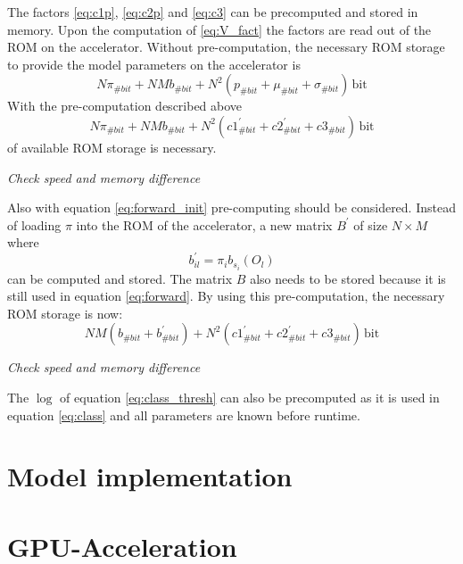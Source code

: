 \documentclass[mscthesis]{usiinfthesis}
\begin{document}
The factors \ref{eq:c1p}, \ref{eq:c2p} and \ref{eq:c3} can be precomputed and
stored in memory. Upon the computation of \ref{eq:V_fact} the factors are read
out of the ROM on the accelerator. Without pre-computation, the necessary ROM
storage to provide the model parameters on the accelerator is
\begin{equation}
    N \pi_{\#bit}
        + NM b_{\#bit}
        + N^2 ( p_{\#bit} + \mu_{\#bit} + \sigma_{\#bit})
        \,\text{bit}
\end{equation}
With the pre-computation described above
\begin{equation}
    N \pi_{\#bit}
        + NM b_{\#bit}
        + N^2 (c1_{\#bit}^{'} + c2_{\#bit}^{'} + c3_{\#bit})
        \,\text{bit}
\end{equation}
of available ROM storage is necessary.

\emph{Check speed and memory difference}

Also with equation \ref{eq:forward_init} pre-computing should be considered.
Instead of loading $ \pi $ into the ROM of the accelerator, a new
matrix $ B^{'} $ of size $ N \times M $ where
\begin{equation}
    b_{il}^{'} = \pi_i b_{s_i}(O_l)
\end{equation}
can be computed and stored. The matrix $ B $ also needs to be stored because
it is still used in equation \ref{eq:forward}. By using this pre-computation,
the necessary ROM storage is now:
\begin{equation}
    NM(b_{\#bit} + b_{\#bit}^{'})
        + N^2(c1_{\#bit}^{'} + c2_{\#bit}^{'} + c3_{\#bit})
        \,\text{bit}
\end{equation}

\emph{Check speed and memory difference}

The $ \log $ of equation \ref{eq:class_thresh} can also be precomputed as it is
used in equation \ref{eq:class} and all parameters are known before runtime.

\section{Model implementation}
\section{GPU-Acceleration}
\end{document}
